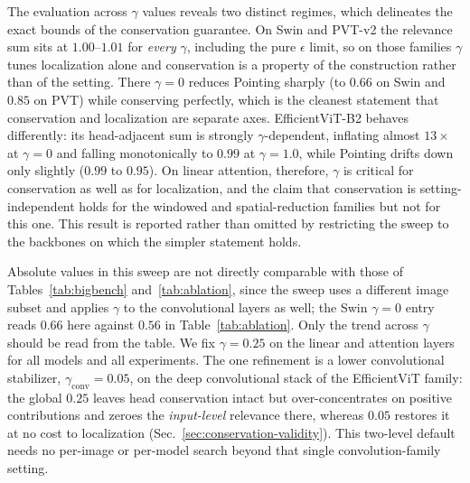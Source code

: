 \documentclass[lettersize,journal]{IEEEtran}
\theoremstyle{definition}
\theoremstyle{plain}
\begin{document}
The evaluation across $\gamma$ values reveals two distinct regimes, which delineates the exact bounds of the conservation guarantee. On Swin and 
PVT-v2 the relevance sum sits at $1.00$--$1.01$ for \emph{every} $\gamma$,
including the pure $\epsilon$ limit, so on those families $\gamma$ tunes
localization alone and conservation is a property of the construction rather
than of the setting. There $\gamma{=}0$ reduces Pointing sharply (to $0.66$ on Swin
and $0.85$ on PVT) while conserving perfectly, which is the cleanest statement
that conservation and localization are separate axes. EfficientViT-B2 behaves
differently: its head-adjacent sum is strongly $\gamma$-dependent, inflating
almost $13\times$ at $\gamma{=}0$ and falling monotonically to $0.99$ at
$\gamma{=}1.0$, while Pointing drifts down only slightly ($0.99$ to $0.95$). On
linear attention, therefore, $\gamma$ is critical for conservation as well
as for localization, and the claim that conservation is setting-independent
holds for the windowed and spatial-reduction families but not for this one. This
result is reported rather than omitted by restricting the sweep to the backbones
on which the simpler statement holds.

Absolute values in this sweep are not directly comparable with those of
Tables~\ref{tab:bigbench} and~\ref{tab:ablation}, since the sweep uses a
different image subset and applies $\gamma$ to the convolutional layers as well;
the Swin $\gamma{=}0$ entry reads $0.66$ here against $0.56$ in
Table~\ref{tab:ablation}. Only the trend across $\gamma$ should be read from the
table. We fix $\gamma{=}0.25$ on the linear and attention layers for all models and all experiments. The one refinement is a lower convolutional stabilizer, $\gamma_{\text{conv}}{=}0.05$, on the deep convolutional stack of the EfficientViT family: the global $0.25$ leaves head conservation intact but over-concentrates on positive contributions and zeroes the \emph{input-level} relevance there, whereas $0.05$ restores it at no cost to localization (Sec.~\ref{sec:conservation-validity}). This two-level default needs no per-image or per-model search beyond that single convolution-family setting.
\end{document}
